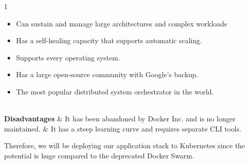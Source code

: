 \begin{table}[H]
\begin{tabularx}{1\textwidth}
\begin{itemize}[leftmargin=*, topsep=0pt, itemsep=1pt, parsep=2pt]
            \item Can sustain and manage large architectures and complex workloads
            \item Has a self-healing capacity that supports automatic scaling.
            \item Supports every operating system.
            \item Has a large open-source community with Google's backup.
            \item The most popular distributed system orchestrator in the world.
        \end{itemize}                                                \\
        \hline
        \textbf {Disadvantages}             & \noindent It has been abandoned by Docker Inc. and is no longer maintained.                                                                                                                                                                                                        & \noindent It has a steep learning curve and requires separate CLI tools. \\
        \hline
    \end{tabularx}
\end{table}
Therefore, we will be deploying our application stack to Kubernetes since the potential is huge compared to the deprecated Docker Swarm.

